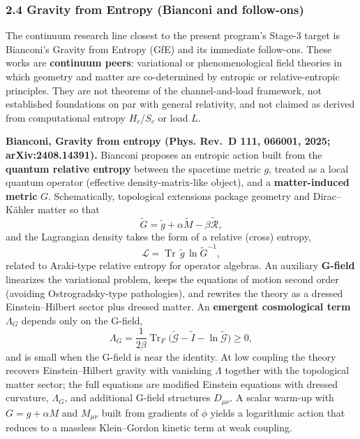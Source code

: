 \documentclass[
  11pt,
]{article}
\begin{document}
\subsubsection{2.4 Gravity from Entropy (Bianconi and follow-ons)}\label{gravity-from-entropy-bianconi-and-follow-ons}

The continuum research line closest to the present program's Stage-3 target is Bianconi's Gravity from Entropy (GfE) and its immediate follow-ons. These works are \textbf{continuum peers}: variational or phenomenological field theories in which geometry and matter are co-determined by entropic or relative-entropic principles. They are not theorems of the channel-and-load framework, not established foundations on par with general relativity, and not claimed as derived from computational entropy \(H_c\)/\(S_c\) or load \(L\).

\textbf{Bianconi, Gravity from entropy (Phys. Rev.~D 111, 066001, 2025; arXiv:2408.14391).} Bianconi proposes an entropic action built from the \textbf{quantum relative entropy} between the spacetime metric \(g\), treated as a local quantum operator (effective density-matrix-like object), and a \textbf{matter-induced metric} \(G\). Schematically, topological extensions package geometry and Dirac--K\"ahler matter so that \[
\tilde G = \tilde g + \alpha \tilde M - \beta \tilde{\mathcal{R}},
\] and the Lagrangian density takes the form of a relative (cross) entropy, \[
\mathcal{L} = \operatorname{Tr}\,\tilde g\,\ln \tilde G^{-1},
\] related to Araki-type relative entropy for operator algebras. An auxiliary \textbf{G-field} linearizes the variational problem, keeps the equations of motion second order (avoiding Ostrogradsky-type pathologies), and rewrites the theory as a dressed Einstein--Hilbert sector plus dressed matter. An \textbf{emergent cosmological term} \(\Lambda_G\) depends only on the G-field, \[
\Lambda_G = \frac{1}{2\beta}\operatorname{Tr}_F\bigl(\tilde{\mathcal{G}} - \tilde I - \ln\tilde{\mathcal{G}}\bigr) \ge 0,
\] and is small when the G-field is near the identity. At low coupling the theory recovers Einstein--Hilbert gravity with vanishing \(\Lambda\) together with the topological matter sector; the full equations are modified Einstein equations with dressed curvature, \(\Lambda_G\), and additional G-field structures \(D_{\mu\nu}\). A scalar warm-up with \(G = g + \alpha M\) and \(M_{\mu\nu}\) built from gradients of \(\phi\) yields a logarithmic action that reduces to a massless Klein--Gordon kinetic term at weak coupling.
\end{document}
